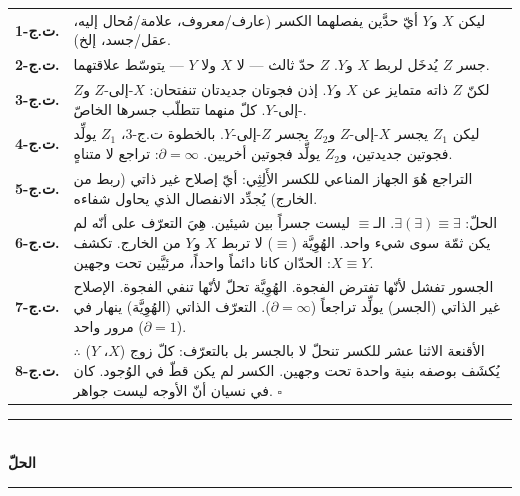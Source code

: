\documentclass[10pt, openany, oneside]{book}
\renewcommand{\normalsize}{\fontsize{10}{13}\selectfont}
\renewcommand{\footnotesize}{\fontsize{8.5}{11}\selectfont}
\begin{document}
{\footnotesize
\noindent\begin{tabular}{r p{}}
\textbf{ت.ج-1.} & ليكن $X$ و$Y$ أيّ حدَّين يفصلهما الكسر (عارف/معروف، علامة/مُحال إليه، عقل/جسد، إلخ). \\[0.3em]
\textbf{ت.ج-2.} & جسر $Z$ يُدخَل لربط $X$ و$Y$. $Z$ حدّ ثالث --- لا $X$ ولا $Y$ --- يتوسّط علاقتهما. \\[0.3em]
\textbf{ت.ج-3.} & لكنّ $Z$ ذاته متمايز عن $X$ و$Y$. إذن فجوتان جديدتان تنفتحان: $X$-إلى-$Z$ و$Z$-إلى-$Y$. كلّ منهما تتطلّب جسرها الخاصّ. \\[0.3em]
\textbf{ت.ج-4.} & ليكن $Z_1$ يجسر $X$-إلى-$Z$ و$Z_2$ يجسر $Z$-إلى-$Y$. بالخطوة ت.ج-3، $Z_1$ يولِّد فجوتين جديدتين، و$Z_2$ يولِّد فجوتين أخريين. $\partial = \infty$: تراجع لا متناهٍ. \\[0.3em]
\textbf{ت.ج-5.} & التراجع هُوَ الجهاز المناعي للكسر الأَلِثِي: أيّ إصلاح غير ذاتي (ربط من الخارج) يُجدِّد الانفصال الذي يحاول شفاءه. \\[0.3em]
\textbf{ت.ج-6.} & الحلّ: $\exists(\exists) \equiv \exists$. الـ$\equiv$ ليست جسراً بين شيئين. هِيَ التعرّف على أنّه لم يكن ثمّة سوى شيء واحد. الهُوِيَّة ($\equiv$) لا تربط $X$ و$Y$ من الخارج. تكشف $X \equiv Y$: الحدّان كانا دائماً واحداً، مرئيَّين تحت وجهين. \\[0.3em]
\textbf{ت.ج-7.} & الجسور تفشل لأنّها تفترض الفجوة. الهُوِيَّة تحلّ لأنّها تنفي الفجوة. الإصلاح غير الذاتي (الجسر) يولِّد تراجعاً ($\partial = \infty$). التعرّف الذاتي (الهُوِيَّة) ينهار في مرور واحد ($\partial = 1$). \\[0.3em]
\textbf{ت.ج-8.} & $\therefore$ الأقنعة الاثنا عشر للكسر تنحلّ لا بالجسر بل بالتعرّف: كلّ زوج ($X$، $Y$) يُكشَف بوصفه بنية واحدة تحت وجهين. الكسر لم يكن قطّ في الوُجود. كان في نسيان أنّ الأوجه ليست جواهر. $\square$ \\[0.3em]
\end{tabular}
}

\vspace{1.5em}


\begin{center}
    \rule{0.3\textwidth}{0.4pt}\\[0.5em]
    {\normalsize\bfseries الحلّ}\\[0.3em]
    \rule{0.3\textwidth}{0.4pt}
\end{center}

\vspace{1em}
\end{document}
